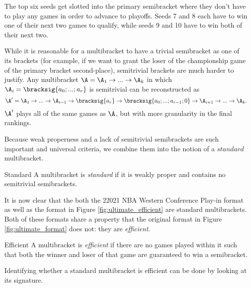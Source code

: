 {    

    The top six seeds get slotted into the primary semibracket where they don't have to play any games in order to advance to playoffs. Seeds 7 and 8 each have to win one of their next two games to qualify, while seeds 9 and 10 have to win both of their next two.

    While it is reasonable for a multibracket to have a trivial semibracket as one of its brackets (for example, if we want to grant the loser of the championship game of the primary bracket second-place), semitrivial brackets are much harder to justify. Any multibracket $\A = \A_1 \to ... \to \A_k$ in which $\A_i = \bracksig{a_0; ...; a_r}$ is semitrivial can be reconstructed as $$\A' = \A_1 \to ... \to \A_{i-1} \to \bracksig{a_r} \to \bracksig{a_0; ...; a_{r-1}; 0} \to \A_{i+1} \to ... \to \A_k.$$ $\A'$ plays all of the same games as $\A$, but with more granularity in the final rankings.

    Because weak properness and a lack of semitrivial semibrackets are such important and universal criteria, we combine them into the notion of a $\textit{standard}$ multibracket.

    \begin{definition}{Standard}{}
        A multibracket is \textit{standard} if it is weakly proper and contains no semitrivial semibrackets.
    \end{definition}

    It is now clear that the both the 22021 NBA Western Conference Play-in format as well as the format in Figure \ref{fig:ultimate_efficient} are standard multibrackets. Both of these formats share a property that the original format in Figure \ref{fig:ultimate_format} does not: they are \textit{efficient}.

    \begin{definition}{Efficient}{}
        A multibracket is \textit{efficient} if there are no games played within it such that both the winner and loser of that game are guaranteed to win a semibracket.
    \end{definition}

    Identifying whether a standard multibracket is efficient can be done by looking at its signature.

    }
